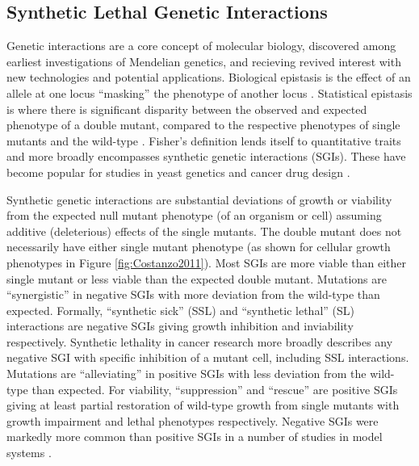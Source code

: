 \subsection{Synthetic Lethal Genetic Interactions}
Genetic interactions are a core concept of molecular biology, discovered among earliest investigations of Mendelian genetics, and recieving revived interest with new technologies and potential applications. Biological epistasis is the effect of an allele at one locus ``masking'' the phenotype of another locus \citep{Bateson1909}. Statistical epistasis is where there is significant disparity between the observed and expected phenotype of a double mutant, compared to the respective phenotypes of single mutants and the wild-type \citep{Fisher1919}. Fisher's definition lends itself to quantitative traits and more broadly encompasses synthetic genetic interactions (SGIs). These have become popular for studies in yeast genetics and cancer drug design \citep{Boone2007, Kaelin2005}.


Synthetic genetic interactions are substantial deviations of growth or viability from the expected null mutant phenotype (of an organism or cell) assuming additive (deleterious) effects of the single mutants. The double mutant does not necessarily have either single mutant phenotype (as shown for cellular growth phenotypes in Figure \ref{fig:Costanzo2011}). Most SGIs are more viable than either single mutant or less viable than the expected double mutant. Mutations are ``synergistic'' in negative SGIs with more deviation from the wild-type than expected. Formally, ``synthetic sick'' (SSL) and ``synthetic lethal'' (SL) interactions are negative SGIs giving growth inhibition and inviability respectively. Synthetic lethality in cancer research more broadly describes any negative SGI with specific inhibition of a mutant cell, including SSL interactions. Mutations are ``alleviating'' in positive SGIs with less deviation from the wild-type than expected. For viability, ``suppression'' and ``rescue'' are positive SGIs giving at least partial restoration of wild-type growth from single mutants with growth impairment and lethal phenotypes respectively. Negative SGIs were markedly more common than positive SGIs in a number of studies in model systems \citet{Tong2004, Boucher2013}. 

